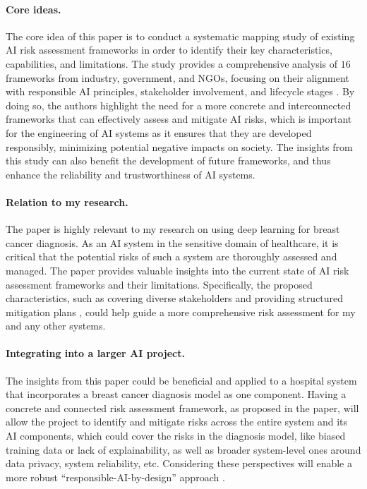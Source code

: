 \documentclass[11pt]{article}
\begin{document}
\paragraph{Core ideas.} 
The core idea of this paper is to conduct a systematic mapping study of existing AI risk assessment frameworks in order to identify their key characteristics, capabilities, and limitations. 
The study provides a comprehensive analysis of $16$ frameworks from industry, government, and NGOs, focusing on their alignment with responsible AI principles, stakeholder involvement, and lifecycle stages \cite{xia2023towards}.
By doing so, the authors highlight the need for a more concrete and interconnected frameworks that can effectively assess and mitigate AI risks, which is important for the engineering of AI systems as it ensures that they are developed responsibly, minimizing potential negative impacts on society. 
The insights from this study can also benefit the development of future frameworks, and thus enhance the reliability and trustworthiness of AI systems.


\paragraph{Relation to my research.}
The paper is highly relevant to my research on using deep learning for breast cancer diagnosis. 
As an AI system in the sensitive domain of healthcare, it is critical that the potential risks of such a system are thoroughly assessed and managed. 
The paper provides valuable insights into the current state of AI risk assessment frameworks and their limitations.
Specifically, the proposed characteristics, such as covering diverse stakeholders and providing structured mitigation plans \cite{xia2023towards}, could help guide a more comprehensive risk assessment for my and any other systems.

\paragraph{Integrating into a larger AI project.}
The insights from this paper could be beneficial and applied to a hospital system that incorporates a breast cancer diagnosis model as one component.
Having a concrete and connected risk assessment framework, as proposed in the paper, will allow the project to identify and mitigate risks across the entire system and its AI components, which could cover the risks in the diagnosis model, like biased training data or lack of explainability, as well as broader system-level ones around data privacy, system reliability, etc. 
Considering these perspectives will enable a more robust ``responsible-AI-by-design'' approach \cite{xia2023towards, lu2023responsible}.
\end{document}
